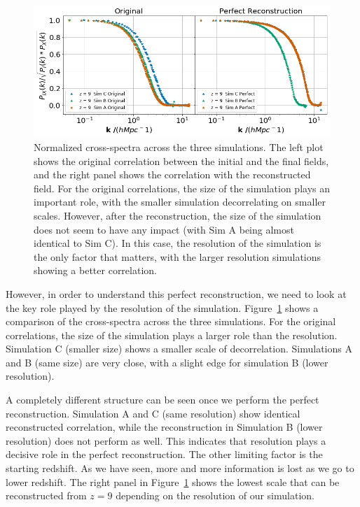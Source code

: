 \begin{figure}
    \centering
    \includegraphics[width=1\columnwidth]{images/perfRecon/simComp.png}%
    
    \caption{
    Normalized cross-spectra across the three simulations. The left plot shows the original correlation between the initial and the final fields, and the right panel shows the correlation with the reconstructed field. For the original correlations, the size of the simulation plays an important role, with the smaller simulation decorrelating on smaller scales. However, after the reconstruction, the size of the simulation does not seem to have any impact (with Sim A being almost identical to Sim C). In this case, the resolution of the simulation is the only factor that matters, with the larger resolution simulations showing a better correlation.
    }
    
    \label{fig:3.3}
\end{figure}
However, in order to understand this perfect reconstruction, we need to look at the key role played by the resolution of the simulation. Figure~\ref{fig:3.3} shows a comparison of the cross-spectra across the three simulations. For the original correlations, the size of the simulation plays a larger role than the resolution. Simulation C (smaller size) shows a smaller scale of decorrelation. Simulations A and B (same size) are very close, with a slight edge for simulation B (lower resolution). 

A completely different structure can be seen once we perform the perfect reconstruction. Simulation A and C (same resolution) show identical reconstructed correlation, while the reconstruction in Simulation B (lower resolution) does not perform as well. This indicates that resolution plays a decisive role in the perfect reconstruction. The other limiting factor is the starting redshift. As we have seen, more and more information is lost as we go to lower redshift. The right panel in Figure~\ref{fig:3.3} shows the lowest scale that can be reconstructed from $z=9$ depending on the resolution of our simulation.

